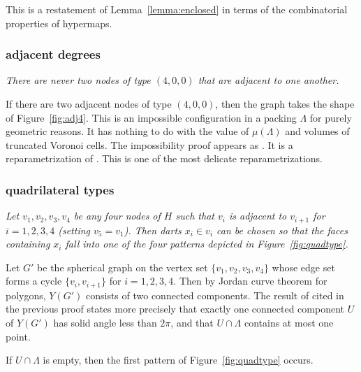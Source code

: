 \documentclass{article} %
\begin{document}
This is a restatement of Lemma~\ref{lemma:enclosed} in terms of the combinatorial
properties of hypermaps.


\subsubsection{adjacent degrees}

{\it There are never two nodes of type $(4,0,0)$ that are adjacent to one another.}

If there are two adjacent nodes of type $(4,0,0)$, then the graph takes the
shape of Figure~\ref{fig:adj4}.  This is an impossible configuration in a packing $\Lambda$
for purely geometric reasons.  It has nothing to do with the value of $\mu(\Lambda)$
and volumes of truncated Voronoi cells.
The impossibility proof appears as \cite[Lemma~3.8]{arx}. It is a reparametrization
of \cite[Prop.4.2]{Part1}.  This is one of the most delicate reparametrizations.

\begin{floatingfigure}{30mm}
  \begin{center}
   \end{center}
  \caption{}
\label{fig:adj4}
\end{floatingfigure}


\subsubsection{quadrilateral types}


{\it Let $v_1,v_2,v_3,v_4$ be any four nodes of $H$ such that $v_i$ is adjacent
to $v_{i+1}$ for $i=1,2,3,4$ (setting $v_5=v_1$).  Then darts $x_i\in v_i$ can be chosen
so that the faces containing $x_i$ fall into one of the four patterns depicted
in Figure~\ref{fig:quadtype}.}

Let $G'$ be the spherical graph on the vertex set $\{v_1,v_2,v_3,v_4\}$
whose edge set forms a cycle $\{v_i,v_{i+1}\}$ for $i=1,2,3,4$.  Then by
Jordan curve theorem for polygons, $Y(G')$ consists of two connected components.
The result of \cite[Lemma~3.8]{arx} cited in the previous proof states more precisely
that exactly one connected component $U$ of $Y(G')$ has solid angle less than $2\pi$,
and that $U\cap\Lambda$ contains at most one point.

If $U\cap\Lambda$ is empty, then the first pattern of Figure~\ref{fig:quadtype} occurs.
\end{document}
